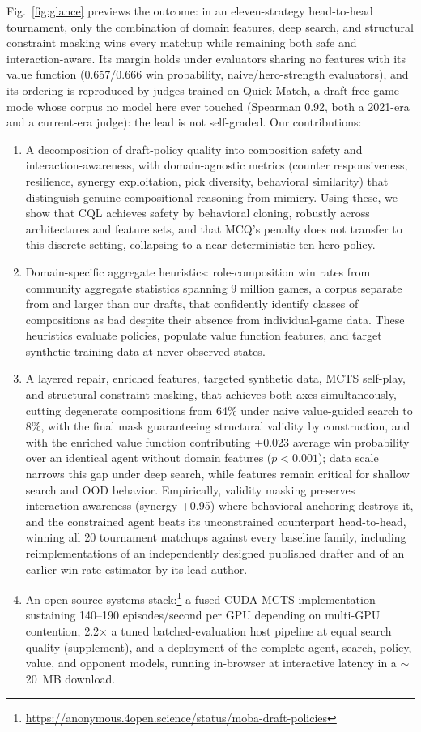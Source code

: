\documentclass[journal]{IEEEtran}
\newcommand{\repourl}{\url{https://anonymous.4open.science/status/moba-draft-policies}}
\newcommand{\repourl}{\url{https://github.com/maxsegan/moba-draft-policies}}
\begin{document}
Fig.~\ref{fig:glance} previews the outcome: in an eleven-strategy head-to-head tournament, only the combination of domain features, deep search, and structural constraint masking wins every matchup while remaining both safe and interaction-aware. Its margin holds under evaluators sharing no features with its value function (0.657/0.666 win probability, naive/hero-strength evaluators), and its ordering is reproduced by judges trained on Quick Match, a draft-free game mode whose corpus no model here ever touched (Spearman 0.92, both a 2021-era and a current-era judge): the lead is not self-graded. Our contributions:
\begin{enumerate}
    \item A decomposition of draft-policy quality into composition safety and interaction-awareness, with domain-agnostic metrics (counter responsiveness, resilience, synergy exploitation, pick diversity, behavioral similarity) that distinguish genuine compositional reasoning from mimicry. Using these, we show that CQL achieves safety by behavioral cloning, robustly across architectures and feature sets, and that MCQ's penalty does not transfer to this discrete setting, collapsing to a near-deterministic ten-hero policy.
    \item Domain-specific aggregate heuristics: role-composition win rates from community aggregate statistics spanning 9 million games, a corpus separate from and larger than our drafts, that confidently identify classes of compositions as bad despite their absence from individual-game data. These heuristics evaluate policies, populate value function features, and target synthetic training data at never-observed states.
    \item A layered repair, enriched features, targeted synthetic data, MCTS self-play, and structural constraint masking, that achieves both axes simultaneously, cutting degenerate compositions from 64\% under naive value-guided search to 8\%, with the final mask guaranteeing structural validity by construction, and with the enriched value function contributing +0.023 average win probability over an identical agent without domain features ($p < 0.001$); data scale narrows this gap under deep search, while features remain critical for shallow search and OOD behavior. Empirically, validity masking preserves interaction-awareness (synergy +0.95) where behavioral anchoring destroys it, and the constrained agent beats its unconstrained counterpart head-to-head, winning all 20 tournament matchups against every baseline family, including reimplementations of an independently designed published drafter and of an earlier win-rate estimator by its lead author.    \item An open-source systems stack:\footnote{\repourl} a fused CUDA MCTS implementation sustaining 140--190 episodes/second per GPU depending on multi-GPU contention, 2.2$\times$ a tuned batched-evaluation host pipeline at equal search quality (supplement), and a deployment of the complete agent, search, policy, value, and opponent models, running in-browser at interactive latency in a $\sim$20~MB download.
\end{enumerate}
\end{document}
